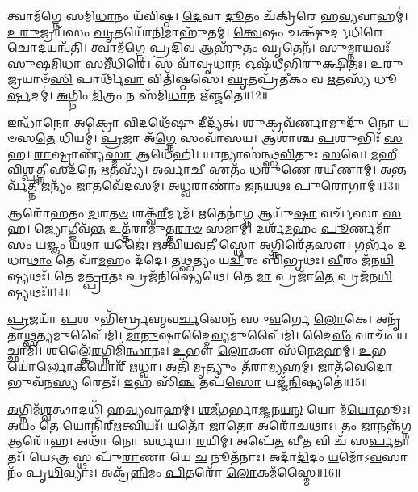 𑌤𑍍𑌵𑌾𑌮᳴𑌗𑍍𑌨𑍇 𑌸𑌮𑌿\-\ul{𑌧𑌾}\-𑌨𑌂 𑌯᳴𑌵𑌿𑌷𑍍𑌠।
\-\ul{𑌦𑍇}\-𑌵𑌾 \ul{𑌦𑍂}\-𑌤𑌂 𑌚᳴𑌕𑍍𑌰𑌿𑌰𑍇 𑌹\-\ul{𑌵𑍍𑌯}\-𑌵𑌾𑌹𑌮𑍍॑।
\-\ul{𑌉}\-\-\ul{𑌰𑍁}\-𑌜𑍍𑌰𑌯᳴𑌸𑌂 \ul{𑌘𑍃}\-𑌤𑌯𑍋᳴\-\ul{𑌨𑌿}\-𑌮𑌾𑌹𑍁᳴𑌤𑌮𑍍।
\-\ul{𑌤𑍍𑌵𑍇}\-𑌷𑌂 𑌚𑌕𑍍𑌷𑍁᳴𑌰𑍍𑌦𑌧𑌿𑌰𑍇 𑌚𑍋\-\ul{𑌦}\-𑌯𑌨𑍍𑌵᳴𑌤𑌿।
𑌤𑍍𑌵𑌾𑌮᳴𑌗𑍍𑌨𑍇 \ul{𑌪𑍍𑌰}\-𑌦𑌿\-\ul{𑌵} 𑌆𑌹𑍁᳴𑌤𑌂 \ul{𑌘𑍃}\-𑌤𑍇𑌨᳴।
\-\ul{𑌸𑍁}\-\-\ul{𑌮𑍍𑌨𑌾}\-𑌯𑌵𑌃᳴ 𑌸𑍁\-\ul{𑌷}\-𑌮𑌿\-\ul{𑌧𑌾} 𑌸𑌮𑍀᳴𑌧𑌿𑌰𑍇।
𑌸 𑌵𑌾᳴𑌵𑍃\-\ul{𑌧𑌾}\-𑌨 𑌓𑌷᳴𑌧𑍀𑌭𑌿𑌰𑍁\-\ul{𑌕𑍍𑌷𑌿}\-𑌤𑌃।
\-\ul{𑌉}\-𑌰𑍁 𑌜𑍍𑌰𑌯𑌾𑍞᳴\-\ul{𑌸𑌿} 𑌪𑌾𑌰𑍍𑌥𑌿᳴\-\ul{𑌵𑌾} 𑌵𑌿𑌤𑌿᳴𑌷𑍍𑌠𑌸𑍇।
\-\ul{𑌘𑍃}\-𑌤𑌪𑍍𑌰᳴𑌤𑍀𑌕𑌂 𑌵 \ul{𑌋}\-𑌤𑌸𑍍𑌯᳴ 𑌧𑍂\-\ul{𑌰𑍍}\-𑌷𑌦𑌮𑍍॑।
\-\ul{𑌅}\-𑌗𑍍𑌨𑌿𑌂 \ul{𑌮𑌿}\-𑌤𑍍𑌰𑌂 𑌨 𑌸᳴𑌮𑌿\-\ul{𑌧𑌾}\-𑌨 𑌋᳴𑌞𑍍𑌜𑌤𑍇॥12॥

𑌇𑌨𑍍𑌧𑌾᳴𑌨𑍋 \ul{𑌅}\-𑌕𑍍𑌰𑍋 \ul{𑌵𑌿}\-𑌦𑌥𑍇᳴\-\ul{𑌷𑍁} 𑌦𑍀𑌦𑍍𑌯᳴𑌤𑍍।
\-\ul{𑌶𑍁}\-𑌕𑍍𑌰𑌵᳴\-\ul{𑌰𑍍𑌣𑌾}\-𑌮𑍁𑌦𑍁᳴ 𑌨𑍋 𑌯𑍞𑌸\-\ul{𑌤𑍇} 𑌧𑌿𑌯𑌮𑍍॑।
\-\ul{𑌪𑍍𑌰}\-𑌜𑌾 𑌅᳴\-\ul{𑌗𑍍𑌨𑍇} 𑌸𑌂𑌵𑌾᳴𑌸𑌯।
𑌆𑌶𑌾॑𑌶𑍍𑌚 \ul{𑌪}\-𑌶𑍁𑌭𑌿𑌃᳴ \ul{𑌸}\-𑌹।
\-\ul{𑌰𑌾}\-𑌷𑍍𑌟𑍍𑌰𑌾𑌣𑍍𑌯᳴\-\ul{𑌸𑍍𑌮𑌾} 𑌆𑌧𑍇᳴𑌹𑌿।
𑌯𑌾𑌨𑍍𑌯𑌾𑌸॑𑌨𑍍𑌥𑍍𑌸\-\ul{𑌵𑌿}\-𑌤𑍁𑌃 \ul{𑌸}\-𑌵𑍇।
\-\ul{𑌮}\-𑌹𑍀 \ul{𑌵𑌿}\-𑌶𑍍𑌪\-\ul{𑌤𑍍𑌨𑍀} 𑌸𑌦᳴𑌨𑍇 \ul{𑌋}\-𑌤𑌸𑍍𑌯᳴।
\-\ul{𑌅}\-𑌰𑍍𑌵𑌾\-\ul{𑌚𑍀} 𑌏𑌤𑌂᳴ 𑌧𑌰𑍁𑌣𑍇 𑌰\-\ul{𑌯𑍀}\-𑌣𑌾𑌮𑍍।
\-\ul{𑌅}\-𑌨𑍍𑌤𑌰𑍍𑌵᳴\-\ul{𑌤𑍍𑌨𑍀} 𑌜𑌨𑍍𑌯𑌂᳴ \ul{𑌜𑌾}\-𑌤𑌵𑍇᳴𑌦𑌸𑌮𑍍।
\-\ul{𑌅}\-\-\ul{𑌧𑍍𑌵}\-𑌰𑌾𑌣𑌾𑌂॑ 𑌜𑌨𑌯𑌥𑌃 𑌪𑍁\-\ul{𑌰𑍋}\-𑌗𑌾𑌮𑍍॥13॥

𑌆𑌰𑍋᳴𑌹𑌤𑌂 \ul{𑌦}\-𑌶\-\ul{𑌤}\-\-\ul{𑍞} 𑌶𑌕𑍍𑌵᳴\-\ul{𑌰𑍀}\-𑌰𑍍𑌮𑌮᳴।
\-\ul{𑌋}\-𑌤𑍇𑌨𑌾॑\-\ul{𑌗𑍍𑌨} 𑌆𑌯𑍁᳴\-\ul{𑌷𑌾} 𑌵𑌰𑍍𑌚᳴𑌸𑌾 \ul{𑌸}\-𑌹।
𑌜𑍍𑌯𑍋𑌗𑍍𑌜𑍀𑌵᳴\-\ul{𑌨𑍍𑌤} 𑌉𑌤𑍍𑌤᳴𑌰𑌾𑌮𑍁𑌤𑍍𑌤\-\ul{𑌰𑌾}\-\-\ul{𑍞} 𑌸𑌮𑌾॑𑌮𑍍।
𑌦𑌰𑍍\mbox{}𑌶᳴\-\ul{𑌮}\-𑌹𑌂 \ul{𑌪𑍂}\-𑌰𑍍𑌣𑌮𑌾᳴𑌸𑌂 \ul{𑌯}\-𑌜𑍍𑌞𑌂 𑌯\-\ul{𑌥𑌾} 𑌯𑌜𑍈॑।
𑌋𑌤𑍍𑌵𑌿᳴𑌯𑌵𑌤𑍀 𑌸𑍍𑌥𑍋 \ul{𑌅}\-𑌗𑍍𑌨𑌿𑌰𑍇᳴𑌤𑌸𑍗।
𑌗𑌰𑍍𑌭𑌂᳴ 𑌦𑌧𑌾\-\ul{𑌥𑌾𑌂} 𑌤𑍇 𑌵𑌾᳴\-\ul{𑌮}\-𑌹𑌂 𑌦᳴𑌦𑍇।
𑌤\-\ul{𑌥𑍍𑌸}\-𑌤𑍍𑌯𑌂 𑌯\-\ul{𑌦𑍍𑌵𑍀}\-𑌰𑌂 𑌬𑌿᳴𑌭𑍃𑌥𑌃।
\-\ul{𑌵𑍀}\-𑌰𑌂 𑌜᳴𑌨\-\ul{𑌯𑌿}\-𑌷𑍍𑌯𑌥𑌃᳴।
𑌤𑍇 𑌮\-\ul{𑌤𑍍𑌪𑍍𑌰𑌾}\-𑌤𑌃 𑌪𑍍𑌰𑌜᳴𑌨𑌿𑌷𑍍𑌯𑍇𑌥𑍇।
𑌤𑍇 \ul{𑌮𑌾} 𑌪𑍍𑌰𑌜𑌾᳴\-\ul{𑌤𑍇} 𑌪𑍍𑌰𑌜᳴𑌨\-\ul{𑌯𑌿}\-𑌷𑍍𑌯𑌥𑌃᳴॥14॥

\-\ul{𑌪𑍍𑌰}\-𑌜𑌯𑌾᳴ \ul{𑌪}\-𑌶𑍁𑌭𑌿᳴𑌰𑍍𑌬𑍍𑌰𑌹𑍍𑌮𑌵\-\ul{𑌰𑍍𑌚}\-𑌸𑍇𑌨᳴ 𑌸𑍁\-\ul{𑌵}\-𑌰𑍍𑌗𑍇 \ul{𑌲𑍋}\-𑌕𑍇।
𑌅𑌨𑍃᳴𑌤𑌾\-\ul{𑌥𑍍𑌸}\-𑌤𑍍𑌯\-𑌮𑍁𑌪𑍈᳴𑌮𑌿।
\-\ul{𑌮𑌾}\-\-\ul{𑌨𑍁}\-𑌷𑌾𑌦𑍍𑌦𑍈\-\ul{𑌵𑍍𑌯}\-𑌮𑍁𑌪𑍈᳴𑌮𑌿।
𑌦𑍈\-\ul{𑌵𑍀𑌂} 𑌵𑌾𑌚𑌂᳴ 𑌯𑌚𑍍𑌛𑌾𑌮𑌿।
𑌶𑌲𑍍𑌕𑍈᳴\-\ul{𑌰}\-𑌗𑍍𑌨𑌿𑌮𑌿᳴\-\ul{𑌨𑍍𑌧𑌾}\-𑌨𑌃।
\-\ul{𑌉}\-𑌭𑍗 \ul{𑌲𑍋}\-𑌕𑍗 𑌸᳴𑌨𑍇\-\ul{𑌮}\-𑌹𑌮𑍍।
\-\ul{𑌉}\-𑌭𑌯𑍋॑\-\ul{𑌰𑍍𑌲𑍋}\-𑌕𑌯𑍋𑌰𑍍᳴ \ul{𑌋}\-𑌧𑍍𑌵𑌾।
𑌅𑌤𑌿᳴ \ul{𑌮𑍃}\-𑌤𑍍𑌯𑍁𑌂 𑌤᳴𑌰𑌾\-\ul{𑌮𑍍𑌯}\-𑌹𑌮𑍍।
𑌜𑌾𑌤᳴𑌵𑍇\-\ul{𑌦𑍋} 𑌭𑍁𑌵᳴𑌨\-\ul{𑌸𑍍𑌯} 𑌰𑍇𑌤𑌃᳴।
\-\ul{𑌇}\-𑌹 𑌸𑌿᳴\-\ul{𑌞𑍍𑌚} 𑌤𑌪᳴\-\ul{𑌸𑍋} 𑌯𑌜𑍍𑌜᳴\-\ul{𑌨𑌿}\-𑌷𑍍𑌯𑌤𑍇॑॥15॥

\-\ul{𑌅}\-𑌗𑍍𑌨𑌿𑌮᳴\-\ul{𑌶𑍍𑌵}\-𑌤𑍍𑌥𑌾𑌦𑌧𑌿᳴ 𑌹\-\ul{𑌵𑍍𑌯}\-𑌵𑌾𑌹𑌮𑍍॑।
\-\ul{𑌶}\-\-\ul{𑌮𑍀}\-\-\ul{𑌗}\-𑌰𑍍𑌭𑌾\-\ul{𑌜𑍍𑌜}\-𑌨\-\ul{𑌯}\-\-\ul{𑌨𑍍} 𑌯𑍋 𑌮᳴\-\ul{𑌯𑍋}\-𑌭𑍂𑌃।
\-\ul{𑌅}\-𑌯𑌂 \ul{𑌤𑍇} 𑌯𑍋𑌨𑌿᳴𑌰𑍍‌\mbox{}\-\ul{𑌋}\-𑌤𑍍𑌵𑌿𑌯𑌃᳴।
𑌯𑌤𑍋᳴ \ul{𑌜𑌾}\-𑌤𑍋 𑌅𑌰𑍋᳴𑌚𑌥𑌾𑌃।
𑌤𑌂 \ul{𑌜𑌾}\-𑌨𑌨𑍍𑌨᳴\-\ul{𑌗𑍍𑌨} 𑌆𑌰𑍋᳴𑌹।
𑌅𑌥𑌾᳴ 𑌨𑍋 𑌵𑌰𑍍𑌧𑌯𑌾 \ul{𑌰}\-𑌯𑌿𑌮𑍍।
𑌅𑌪𑍇᳴\-\ul{𑌤} 𑌵𑍀\-\ul{𑌤} 𑌵𑌿 𑌚᳴ 𑌸\-\ul{𑌰𑍍𑌪}\-𑌤𑌾𑌤𑌃᳴।
𑌯𑍇𑌽\-\ul{𑌤𑍍𑌰} 𑌸𑍍𑌥 𑌪𑍁᳴\-\ul{𑌰𑌾}\-𑌣𑌾 𑌯𑍇 \ul{𑌚} 𑌨𑍂𑌤᳴𑌨𑌾𑌃।
𑌅𑌦𑌾᳴\-\ul{𑌦𑌿}\-𑌦𑌂 \ul{𑌯}\-𑌮𑍋᳴\-𑌽\-\ul{𑌵}\-𑌸𑌾𑌨𑌂᳴ 𑌪𑍃\-\ul{𑌥𑌿}\-𑌵𑍍𑌯𑌾𑌃।
𑌅𑌕𑍍𑌰᳴\-\ul{𑌨𑍍𑌨𑌿}\-𑌮𑌂 \ul{𑌪𑌿}\-𑌤𑌰𑍋᳴ \ul{𑌲𑍋}\-𑌕𑌮᳴𑌸𑍍𑌮𑍈॥16॥

